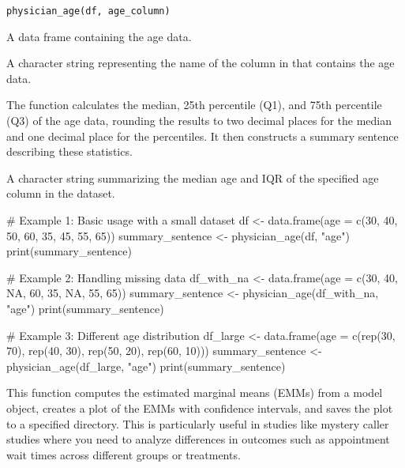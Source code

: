\documentclass[a4paper]{book}
\begin{document}
%
\begin{Usage}
\begin{verbatim}
physician_age(df, age_column)
\end{verbatim}
\end{Usage}
%
\begin{Arguments}
\begin{ldescription}
\item[\code{df}] A data frame containing the age data.

\item[\code{age\_column}] A character string representing the name of the column in  that contains the age data.
\end{ldescription}
\end{Arguments}
%
\begin{Details}
The function calculates the median, 25th percentile (Q1), and 75th percentile (Q3) of the age data, rounding the results to two decimal places for the median and one decimal place for the percentiles. It then constructs a summary sentence describing these statistics.
\end{Details}
%
\begin{Value}
A character string summarizing the median age and IQR of the specified age column in the dataset.
\end{Value}
%
\begin{Examples}
\begin{ExampleCode}
# Example 1: Basic usage with a small dataset
df <- data.frame(age = c(30, 40, 50, 60, 35, 45, 55, 65))
summary_sentence <- physician_age(df, "age")
print(summary_sentence)

# Example 2: Handling missing data
df_with_na <- data.frame(age = c(30, 40, NA, 60, 35, NA, 55, 65))
summary_sentence <- physician_age(df_with_na, "age")
print(summary_sentence)

# Example 3: Different age distribution
df_large <- data.frame(age = c(rep(30, 70), rep(40, 30), rep(50, 20), rep(60, 10)))
summary_sentence <- physician_age(df_large, "age")
print(summary_sentence)

\end{ExampleCode}
\end{Examples}
%
\begin{Description}
This function computes the estimated marginal means (EMMs) from a model object, creates a plot of the EMMs with confidence intervals, and saves the plot to a specified directory. This is particularly useful in studies like mystery caller studies where you need to analyze differences in outcomes such as appointment wait times across different groups or treatments.
\end{Description}
\end{document}
